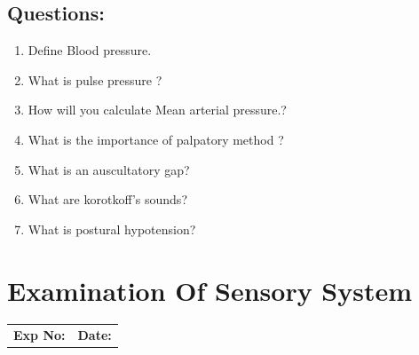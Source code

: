 \documentclass[a4paper,12pt]{book}
\begin{document}
\section*{Questions:}
\begin{enumerate}
\item{Define Blood pressure.}
\item{What is pulse pressure ?}
\item{How will you calculate Mean arterial pressure.?}
\item{What is the importance of palpatory method ?}
\item{What is an auscultatory gap?}
\item{What are korotkoff’s sounds?}
\item{What is postural hypotension?}
\end{enumerate}

															\chapter*{\centering Examination Of Sensory System}
															\begin{tabular}{p{5in} p{1in}}
																\textbf{Exp No:}  & \textbf{Date:}\\
															\end{tabular}
\end{document}
